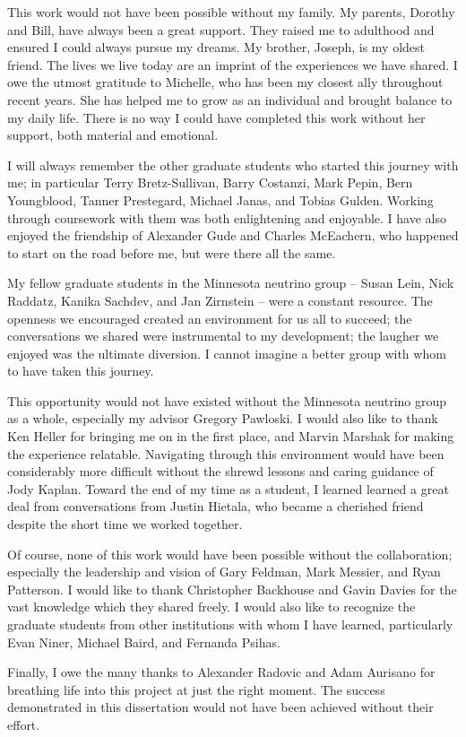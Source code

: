 This work would not have been possible without my family.
My parents, Dorothy and Bill, have always been a great support.
They raised me to adulthood and ensured I could always pursue
my dreams.
My brother, Joseph, is my oldest friend.
The lives we live today are an imprint of the experiences we have shared.
I owe the utmost gratitude to Michelle, who has been my closest ally
throughout recent years.
She has helped me to grow as an individual and brought balance
to my daily life.
There is no way I could have completed this work without her support,
both material and emotional.


I will always remember the other graduate students who
started this journey with me; in particular
Terry Bretz-Sullivan, Barry Costanzi, Mark Pepin, Bern Youngblood,
Tanner Prestegard, Michael Janas, and Tobias Gulden.
Working through coursework with them was both enlightening and
enjoyable.
I have also enjoyed the friendship of Alexander Gude and Charles McEachern,
who happened to start on the road before me, but were there all the same.

My fellow graduate students in the Minnesota neutrino group --
Susan Lein, Nick Raddatz, Kanika Sachdev, and Jan Zirnstein  --
were a constant resource.
The openness we encouraged created an environment for us all to succeed;
the conversations we shared were instrumental to my development;
the laugher we enjoyed was the ultimate diversion.
I cannot imagine a better group with whom to have taken this journey.

This opportunity would not have existed without the Minnesota neutrino group
as a whole, especially my advisor Gregory Pawloski.
I would also like to thank Ken Heller for bringing me on in the first place,
and Marvin Marshak for making the experience relatable.
Navigating through this environment would have been considerably more
difficult without the shrewd lessons and caring guidance of Jody Kaplan.
Toward the end of my time as a student, I learned learned a great deal from
conversations from Justin Hietala, who became a cherished friend despite the
short time we worked together.

Of course, none of this work would have been possible without the \nova
collaboration; especially the leadership and vision of Gary Feldman,
Mark Messier, and Ryan Patterson.
I would like to thank Christopher Backhouse and Gavin Davies
for the vast knowledge which they shared freely.
I would also like to recognize the graduate students from
other institutions with whom I have learned, particularly
Evan Niner, Michael Baird, and Fernanda Psihas.

Finally, I owe the many thanks to Alexander Radovic and Adam Aurisano
for breathing life into this project at just the right moment.
The success demonstrated in this dissertation
would not have been achieved without their effort.

